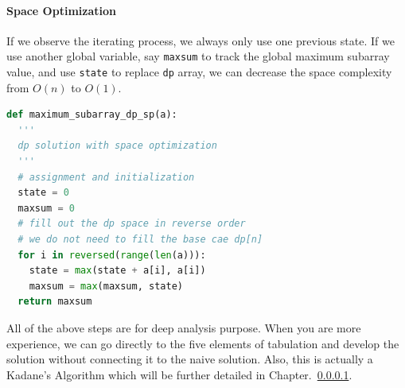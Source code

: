 \documentclass[../main.tex]{subfiles}
\begin{document}
\paragraph{Space Optimization}

If we observe the iterating process, we always only use one previous state. If we use another global variable, say \texttt{maxsum} to track the global maximum subarray value, and use \texttt{state} to replace \texttt{dp} array, we can decrease the space complexity from $O(n)$ to $O(1)$. %
\begin{lstlisting}[language = Python]
def maximum_subarray_dp_sp(a):
  '''
  dp solution with space optimization
  '''
  # assignment and initialization
  state = 0
  maxsum = 0
  # fill out the dp space in reverse order
  # we do not need to fill the base cae dp[n]
  for i in reversed(range(len(a))):
    state = max(state + a[i], a[i])
    maxsum = max(maxsum, state)
  return maxsum
\end{lstlisting}

All of the above steps are for deep analysis purpose. When you are more experience, we can go directly to the five elements of tabulation and develop the solution without connecting it to the naive solution. Also, this is actually a Kadane's Algorithm which will be further detailed in Chapter.~\ref{}. 



\end{document}
